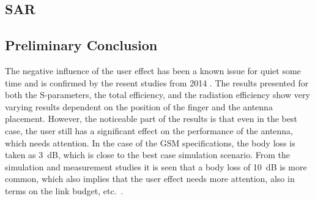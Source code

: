 \subsection{SAR}

\subsection{Preliminary Conclusion}
The negative influence of the user effect has been a known issue for quiet some time and is confirmed by the resent studies from 2014 \cite{Samantha2014UserEff}. The results presented for both the S-parameters, the total efficiency, and the radiation efficiency show very varying results dependent on the position of the finger and the antenna placement. However, the noticeable part of the results is that even in the best case, the user still has a significant effect on the performance of the antenna, which needs attention. In the case of the GSM specifications, the body loss is taken as \SI{3}{dB}, which is close to the best case simulation scenario. From the simulation and measurement studies it is seen that a body loss of \SI{10}{dB} is more common, which also implies that the user effect needs more attention, also in terms on the link budget, etc.\ \cite{sanchez2008multiband}.
